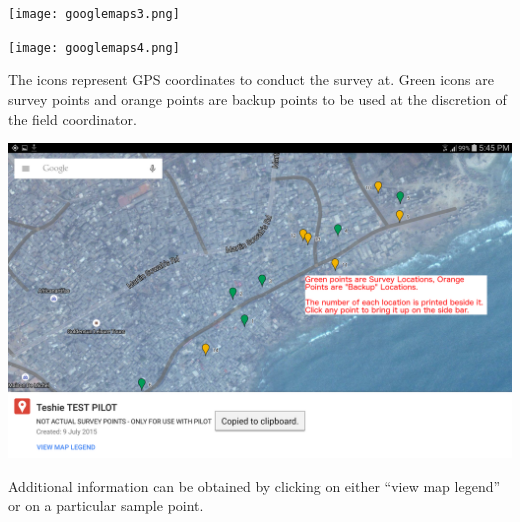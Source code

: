 \documentclass[a4paper]{refart}
\begin{document}
\texttt{[image: googlemaps3.png]}

\texttt{[image: googlemaps4.png]}

The icons represent GPS coordinates to conduct the survey at. Green icons are survey points and orange points are backup points to be used at the discretion of the field coordinator.

\includegraphics[width=\textwidth]{googlemaps5.png}

Additional information can be obtained by clicking on either ``view map legend'' or on a particular sample point.
\end{document}
